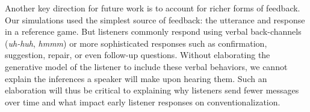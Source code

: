 %

Another key direction for future work is to account for richer forms of feedback.
Our simulations used the simplest source of feedback: the utterance and response in a reference game.
But listeners commonly respond using verbal back-channels (\emph{uh-huh}, \emph{hmmm}) or more sophisticated responses such as confirmation, suggestion, repair, or even follow-up questions. 
Without elaborating the generative model of the listener to include these verbal behaviors, we cannot explain the inferences a speaker will make upon hearing them.
Such an elaboration will thus be critical to explaining why listeners send fewer messages over time and what impact early listener responses on conventionalization. 

%
